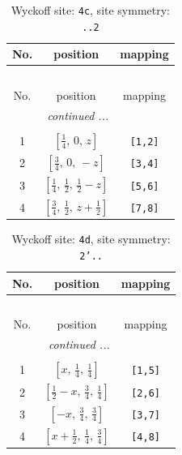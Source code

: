 \documentclass[fleqn,8pt]{jsarticle}
\begin{document}
\renewcommand{\arraystretch}{1.2}
\begin{longtable}{ccc}
\caption{Wyckoff site: {\tt 4c}, site symmetry: {\tt ..2}}
 \\
 \hline \hline
No. & position & mapping \\ \hline \endfirsthead

\multicolumn{2}{l}{\tablename\ \thetable{}} \\
 \hline \hline
No. & position & mapping \\ \hline \endhead

 \hline \hline
\multicolumn{2}{r}{\footnotesize\it continued ...} \\ \endfoot

 \hline \hline
\multicolumn{2}{r}{} \\ \endlastfoot

1 & $\left[ \frac{1}{4},\, 0,\, z \right]$ & {\tt [1,2]} \\ \hline
2 & $\left[ \frac{3}{4},\, 0,\, - z \right]$ & {\tt [3,4]} \\ \hline
3 & $\left[ \frac{1}{4},\, \frac{1}{2},\, \frac{1}{2} - z \right]$ & {\tt [5,6]} \\ \hline
4 & $\left[ \frac{3}{4},\, \frac{1}{2},\, z + \frac{1}{2} \right]$ & {\tt [7,8]} \\
\end{longtable}
\renewcommand{\arraystretch}{1.2}
\begin{longtable}{ccc}
\caption{Wyckoff site: {\tt 4d}, site symmetry: {\tt 2'..}}
 \\
 \hline \hline
No. & position & mapping \\ \hline \endfirsthead

\multicolumn{2}{l}{\tablename\ \thetable{}} \\
 \hline \hline
No. & position & mapping \\ \hline \endhead

 \hline \hline
\multicolumn{2}{r}{\footnotesize\it continued ...} \\ \endfoot

 \hline \hline
\multicolumn{2}{r}{} \\ \endlastfoot

1 & $\left[ x,\, \frac{1}{4},\, \frac{1}{4} \right]$ & {\tt [1,5]} \\ \hline
2 & $\left[ \frac{1}{2} - x,\, \frac{3}{4},\, \frac{1}{4} \right]$ & {\tt [2,6]} \\ \hline
3 & $\left[ - x,\, \frac{3}{4},\, \frac{3}{4} \right]$ & {\tt [3,7]} \\ \hline
4 & $\left[ x + \frac{1}{2},\, \frac{1}{4},\, \frac{3}{4} \right]$ & {\tt [4,8]} \\
\end{longtable}
\end{document}
